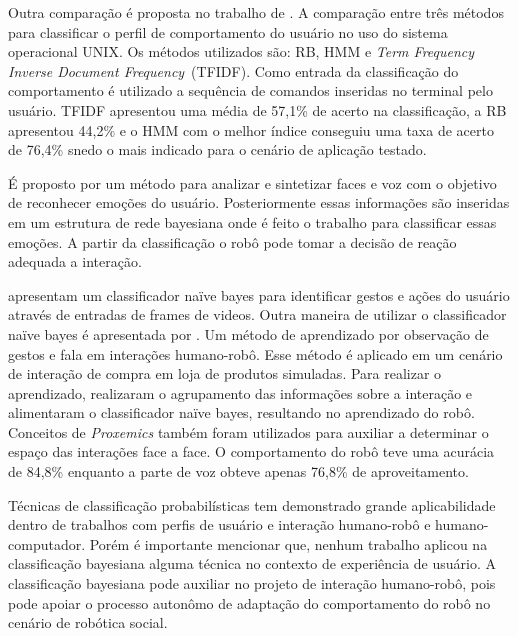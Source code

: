 Outra comparação é proposta no trabalho de . A comparação entre três métodos para classificar o perfil de comportamento do usuário no uso do sistema operacional UNIX. Os métodos utilizados são: RB, HMM e \emph{Term Frequency Inverse Document Frequency}~(TFIDF). Como entrada da classificação do comportamento é utilizado a sequência de comandos inseridas no terminal pelo usuário. TFIDF apresentou uma média de 57,1\% de acerto na classificação, a RB apresentou 44,2\% e o HMM com o melhor índice conseguiu uma taxa de acerto de 76,4\% snedo o mais indicado para o cenário de aplicação testado.

É proposto por  um método para analizar e sintetizar faces e voz com o objetivo de reconhecer emoções do usuário. Posteriormente essas informações são inseridas em um estrutura de rede bayesiana onde é feito o trabalho para classificar essas emoções. A partir da classificação o robô pode tomar a decisão de reação adequada a interação.

 apresentam um classificador naïve bayes para identificar gestos e ações do usuário através de entradas de frames de videos. Outra maneira de utilizar o classificador naïve bayes é apresentada por . Um método de aprendizado por observação de gestos e fala em interações humano-robô. Esse método é aplicado em um cenário de interação de compra em loja de produtos simuladas. Para realizar o aprendizado,  realizaram o agrupamento das informações sobre a interação e alimentaram o classificador naïve bayes, resultando no aprendizado do robô. Conceitos de \emph{Proxemics} também foram utilizados para auxiliar a determinar o espaço das interações face a face. O comportamento do robô teve uma acurácia de 84,8\% enquanto a parte de voz obteve apenas 76,8\% de aproveitamento.

Técnicas de classificação probabilísticas tem demonstrado grande aplicabilidade dentro de trabalhos com perfis de usuário e interação humano-robô e humano-computador. Porém é importante mencionar que, nenhum trabalho aplicou na classificação bayesiana alguma técnica no contexto de experiência de usuário. A classificação bayesiana pode auxiliar no projeto de interação humano-robô, pois pode apoiar o processo autonômo de adaptação do comportamento do robô no cenário de robótica social.

